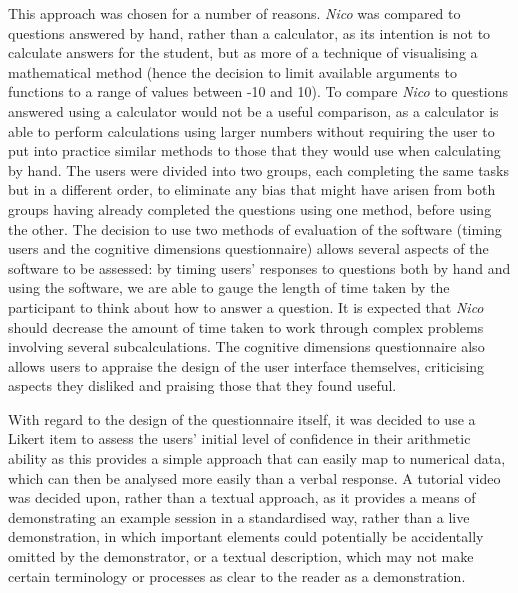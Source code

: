 \documentclass[12pt,twoside,notitlepage,xetex]{report}
\begin{document}
This approach was chosen for a number of reasons.  \emph{Nico} was compared to questions answered by hand, rather than a calculator, as its intention is not to calculate answers for the student, but as more of a technique of visualising a mathematical method (hence the decision to limit available arguments to functions to a range of values between -10 and 10).  To compare \emph{Nico} to questions answered using a calculator would not be a useful comparison, as a calculator is able to perform calculations using larger numbers without requiring the user to put into practice similar methods to those that they would use when calculating by hand.  The users were divided into two groups, each completing the same tasks but in a different order, to eliminate any bias that might have arisen from both groups having already completed the questions using one method, before using the other.  The decision to use two methods of evaluation of the software (timing users and the cognitive dimensions questionnaire) allows several aspects of the software to be assessed: by timing users' responses to questions both by hand and using the software, we are able to gauge the length of time taken by the participant to think about how to answer a question.  It is expected that \emph{Nico} should decrease the amount of time taken to work through complex problems involving several subcalculations.  The cognitive dimensions questionnaire also allows users to appraise the design of the user interface themselves, criticising aspects they disliked and praising those that they found useful.

With regard to the design of the questionnaire itself, it was decided to use a Likert item to assess the users' initial level of confidence in their arithmetic ability as this provides a simple approach that can easily map to numerical data, which can then be analysed more easily than a verbal response.  A tutorial video was decided upon, rather than a textual approach, as it provides a means of demonstrating an example session in a standardised way, rather than a live demonstration, in which important elements could potentially be accidentally omitted by the demonstrator, or a textual description, which may not make certain terminology or processes as clear to the reader as a demonstration.
\end{document}
